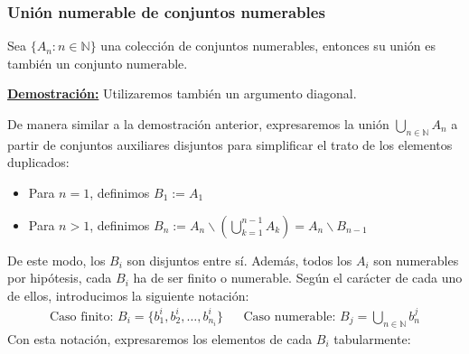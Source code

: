\documentclass[12pt,a4paper]{article}
\newcommand{\N}{\mathbb{N}}
\newcounter{unit}[section]
\newcounter{chapter}[unit]
\renewcommand{\theunit}{\arabic{unit}}
\renewcommand{\thechapter}{\arabic{chapter}}
\renewcommand{\thesubsubsection}{\theunit.\thechapter.\arabic{subsubsection}}
\newcommand{\result}[1]{%
  \subsubsection{#1}%
  \label{result:\thesubsubsection}
}
\newcommand{\dem}{
    \noindent \underline{\textbf{Demostración:}}
}
\begin{document}
\vspace{6mm}
\result{Unión numerable de conjuntos numerables}
\hspace{3mm}
Sea $\{A_n : n \in \N\}$ una colección de conjuntos numerables, entonces su unión
es también un conjunto numerable.

\vspace{4mm}
\dem Utilizaremos también un argumento diagonal.
\newpage

De manera similar a la demostración anterior, expresaremos la unión $\bigcup_{n \in \N} A_n$ a partir de conjuntos
auxiliares disjuntos para simplificar el trato de los elementos duplicados:
\vspace{-2mm}
\begin{itemize}
    \item Para $n = 1$, definimos $B_1 := A_1$
    \item Para $n > 1$, definimos $B_n := A_n \backslash \left(\bigcup_{k=1}^{n-1}A_k\right) = A_n \backslash B_{n-1}$
\end{itemize}
De este modo, los $B_i$ son disjuntos entre sí. Además, todos los $A_i$ son numerables por hipótesis, cada $B_i$ 
ha de ser finito o numerable. Según el carácter de cada uno de ellos, introducimos la siguiente notación:
\begin{align*}
    \text{Caso finito: } B_i = \big\{b^i_1, b^i_2, \ldots, b^i_{n_i} \big\} &&
    \text{Caso numerable: } B_j = \bigcup_{n \in \N}b^j_n
\end{align*}
Con esta notación, expresaremos los elementos de cada $B_i$ tabularmente:
\end{document}

